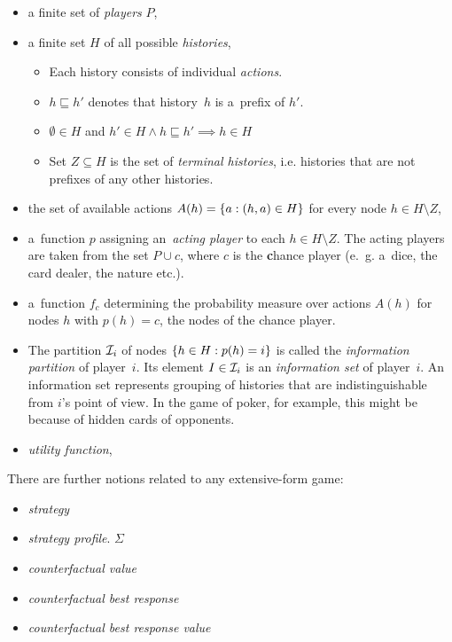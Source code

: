 \begin{itemize}
  \item a finite set of \emph{players} $P$,
  \item a finite set $H$ of all possible \emph{histories},
    \begin{itemize}
      \item Each history consists of individual \emph{actions}.
      \item $h \sqsubseteq h'$ denotes that history~$h$ is a~prefix of $h'$.
      \item $\emptyset \in H$ and $h' \in H \land h \sqsubseteq h' \implies h \in H$
      \item Set $Z \subseteq H$ is the set of \emph{terminal histories}, i.e. histories that are not prefixes of any other histories.
    \end{itemize}
  \item the set of available actions $A(h) = \left\{ a: (h, a) \in H \right\}$ for every node $h \in H \setminus Z$,
  \item a~function $p$ assigning an~\emph{acting player} to each $h \in H \setminus Z$.
    The acting players are taken from the set $P \cup c$, where $c$ is the \textbf{c}hance player (e.~g. a~dice, the card dealer, the nature etc.).
  \item a~function $f_c$ determining the probability measure over actions $A(h)$ for nodes $h$ with $p(h) = c$, the nodes of the chance player.
  \item The partition $\mathcal{I}_i$ of nodes $\left\{ h \in H: p(h) = i \right\}$ is called the \emph{information partition} of player~$i$.
    Its element $I \in \mathcal{I}_i$ is an \emph{information set} of player~$i$.
    An information set represents grouping of histories that are indistinguishable from $i$'s point of view.
    In the game of poker, for example, this might be because of hidden cards of opponents.
  \item \emph{utility function},
\end{itemize}

There are further notions related to any extensive-form game:

\begin{itemize}
  \item \emph{strategy}
  \item \emph{strategy profile}. $\Sigma$
  \item \emph{counterfactual value}
  \item \emph{counterfactual best response}
  \item \emph{counterfactual best response value}
\end{itemize}

